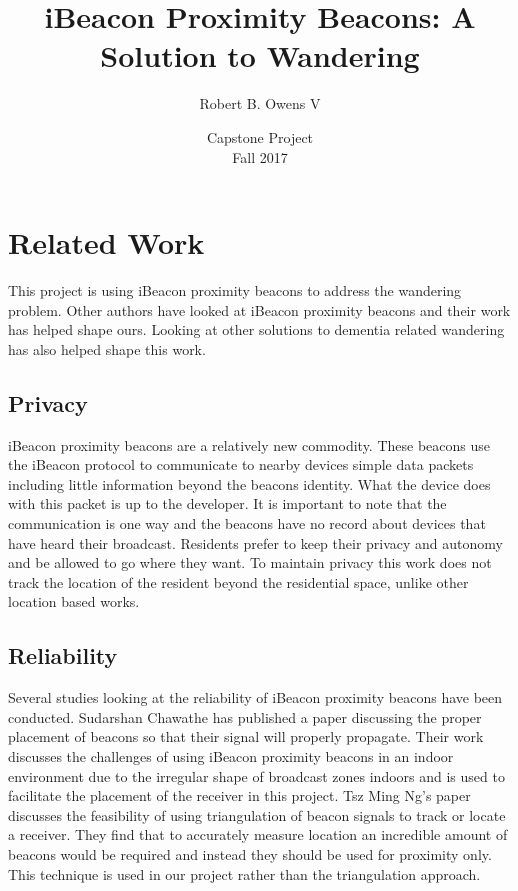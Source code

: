 \documentclass[11pt]{article}
\title{iBeacon Proximity Beacons: A Solution to Wandering}
\author{Robert B. Owens V}
\date{\small Capstone Project\\[.5em]
\small Fall 2017}
\begin{document}
\maketitle

\section{Related Work}
This project is using iBeacon proximity beacons to address the wandering problem. Other authors have looked at iBeacon proximity beacons and their work has helped shape ours. Looking at other solutions to dementia related wandering has also helped shape this work.

\subsection{Privacy}
iBeacon proximity beacons are a relatively new commodity. These beacons use the iBeacon protocol to communicate to nearby devices simple data packets including little information beyond the beacons identity. What the device does with this packet is up to the developer. It is important to note that the communication is one way and the beacons have no record about devices that have heard their broadcast. Residents prefer to keep their privacy and autonomy and be allowed to go where they want\cite{robinson}. To maintain privacy this work does not track the location of the resident beyond the residential space, unlike other location based works\cite{wong}. 

\subsection{Reliability}
Several studies looking at the reliability of iBeacon proximity beacons have been conducted. Sudarshan Chawathe has published a paper discussing the proper placement of beacons so that their signal will properly propagate\cite{chawathe}. Their work discusses the challenges of using iBeacon proximity beacons in an indoor environment due to the irregular shape of broadcast zones indoors and is used to facilitate the placement of the receiver in this project. Tsz Ming Ng's paper discusses the feasibility of using triangulation of beacon signals to track or locate a receiver. They find that to accurately measure location an incredible amount of beacons would be required and instead they should be used for proximity only\cite{ng}. This technique is used in our project rather than the triangulation approach. 
\end{document}
